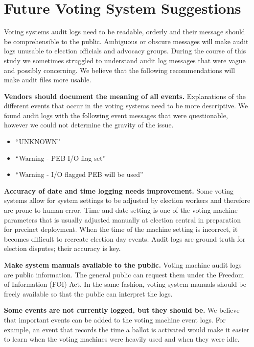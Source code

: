 \section{Future Voting System Suggestions}
Voting systems audit logs need to be readable, orderly and their message should
be  comprehensible to the public. Ambiguous or obscure messages will make audit
logs unusable to election officials and advocacy groups. During the course of
this study we sometimes struggled to understand audit log messages that were
vague and possibly concerning. We believe that the following recommendations
will make audit files more usable.


\textbf{Vendors should document the meaning of all events.} Explanations of the different events that occur in the voting systems need to be more descriptive.  We found audit logs with the following event messages that were questionable, however we could not determine the gravity of the issue.
\begin{itemize}
	\item \textquotedblleft UNKNOWN\textquotedblright
	\item \textquotedblleft Warning - PEB I/O flag set\textquotedblright
	\item \textquotedblleft Warning - I/O flagged PEB will be used\textquotedblright
\end{itemize}

\textbf{Accuracy of date and time logging needs improvement.} Some voting
systems allow for system settings to be adjusted by election workers and
therefore are prone to human error. Time and date setting is one of the voting
machine parameters that is usually adjusted manually at election central in
preparation for precinct deployment. When the time of the machine setting is
incorrect, it becomes difficult to recreate election day events. Audit logs are
ground truth for election disputes; their accuracy is key. 

\textbf{Make system manuals available to the public.} Voting machine audit logs are public information. The general public can request them under the Freedom of Information (FOI) Act. In the same fashion, voting system manuals should be freely available so that the public can interpret the logs. 

\textbf{Some events are not currently logged, but they should be.} We believe
that important events can be added to the voting machine event logs. For
example, an event that records the time a ballot is activated would make it
easier to learn when the voting machines were heavily used and when they were idle.


